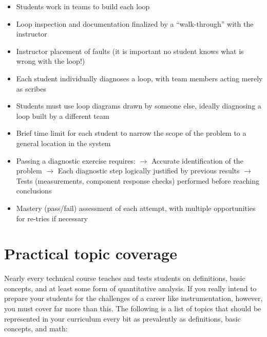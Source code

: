 \begin{itemize}
\item Students work in teams to build each loop
\item Loop inspection and documentation finalized by a ``walk-through'' with the instructor
\item Instructor placement of faults (it is important no student knows what is wrong with the loop!)
\item Each student individually diagnoses a loop, with team members acting merely as scribes
\item Students must use loop diagrams drawn by someone else, ideally diagnosing a loop built by a different team
\item Brief time limit for each student to narrow the scope of the problem to a general location in the system
\item Passing a diagnostic exercise requires:
\subitem $\rightarrow$ Accurate identification of the problem
\subitem $\rightarrow$ Each diagnostic step logically justified by previous results
\subitem $\rightarrow$ Tests (measurements, component response checks) performed before reaching conclusions
\item Mastery (pass/fail) assessment of each attempt, with multiple opportunities for re-tries if necessary
\end{itemize}










\filbreak
\section{Practical topic coverage}

Nearly every technical course teaches and tests students on definitions, basic concepts, and at least some form of quantitative analysis.  If you really intend to prepare your students for the challenges of a career like instrumentation, however, you must cover far more than this.  The following is a list of topics that should be represented in your curriculum every bit as prevalently as definitions, basic concepts, and math:


